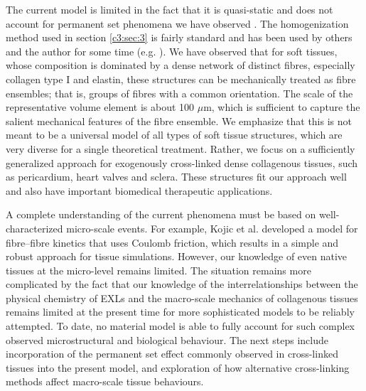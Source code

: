     The current model is limited in the fact that it is quasi-static and does not account for permanent set phenomena we have observed \cite{sun_response_2004}. The homogenization method used in section \ref{c3:sec:3} is fairly standard and has been used by others and the author for some time (e.g. \cite{sacks_incorporation_2003,fata_insights_2014,fan_simulation_2014}). We have observed that for soft tissues, whose composition is dominated by a dense network of distinct fibres, especially collagen type I and elastin, these structures can be mechanically treated as fibre ensembles; that is, groups of fibres with a common orientation. The scale of the representative volume element is about 100 $\mu$m, which is sufficient to capture the salient mechanical features of the fibre ensemble. We emphasize that this is not meant to be a universal model of all types of soft tissue structures, which are very diverse for a single theoretical treatment. Rather, we focus on a sufficiently generalized approach for exogenously cross-linked dense collagenous tissues, such as pericardium, heart valves and sclera. These structures fit our approach well and also have important biomedical therapeutic applications.


    A complete understanding of the current phenomena must be based on well-characterized micro-scale events. For example, Kojic et al. \cite{kojic_numerical_1998} developed a model for fibre–fibre kinetics that uses Coulomb friction, which results in a simple and robust approach for tissue simulations. However, our knowledge of even native tissues at the micro-level remains limited. The situation remains more complicated by the fact that our knowledge of the interrelationships between the physical chemistry of EXLs and the macro-scale mechanics of collagenous tissues remains limited at the present time for more sophisticated models to be reliably attempted. To date, no material model is able to fully account for such complex observed microstructural and biological behaviour. The next steps include incorporation of the permanent set effect commonly observed in cross-linked tissues into the present model, and exploration of how alternative cross-linking methods affect macro-scale tissue behaviours.